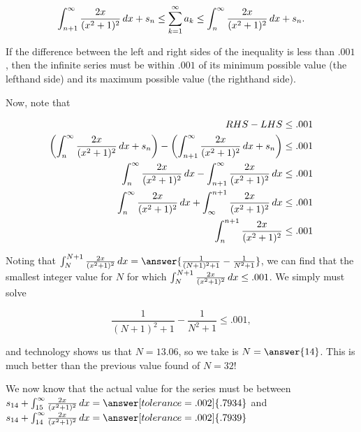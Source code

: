 \documentclass{ximera}
\begin{document}
\begin{exercise}
\begin{exercise}
\begin{exercise}
\begin{exercise}
\begin{exercise}
\[
\int_{n+1}^\infty \frac{2x}{(x^2+1)^2} \mathop{}\!d x  +s_n \leq \sum_{k=1}^{\infty} a_k \leq \int_{n}^\infty \frac{2x}{(x^2+1)^2} \mathop{}\!d x  +s_n.
\]
 
If the difference between the left and right sides of the inequality is less than $.001$, then the infinite series must be within $.001$ of its minimum possible value (the lefthand side) and its maximum possible value (the righthand side).
 
 Now, note that

\begin{align*}
RHS-LHS &\leq .001 \\
\left( \int_{n}^\infty \frac{2x}{(x^2+1)^2} \mathop{}\!d x  +s_n\right) - \left( \int_{n+1}^\infty \frac{2x}{(x^2+1)^2} \mathop{}\!d x  +s_n \right) &\leq .001 \\
 \int_{n}^\infty \frac{2x}{(x^2+1)^2} \mathop{}\!d x  - \int_{n+1}^\infty \frac{2x}{(x^2+1)^2} \mathop{}\!d x   &\leq .001 \\
  \int_{n}^\infty \frac{2x}{(x^2+1)^2} \mathop{}\!d x  +  \int_{\infty}^{n+1} \frac{2x}{(x^2+1)^2} \mathop{}\!d x   &\leq .001 \\
    \int_{n}^{n+1} \frac{2x}{(x^2+1)^2}  &\leq .001 \\
\end{align*} 

Noting that $\int_N^{N+1}  \frac{2x}{(x^2+1)^2} \d x = \answer{\frac{1}{(N+1)^2+1} - \frac{1}{N^2+1}}$, we can find that the smallest integer value for $N$ for which $\int_N^{N+1}  \frac{2x}{(x^2+1)^2} \mathop{}\!d x \leq .001$.  We simply must solve

\[
\frac{1}{(N+1)^2+1} - \frac{1}{N^2+1} \leq .001,
\]

and technology shows us that $N=13.06$, so we take is $N= \answer{14}$.  This is much better than the previous value found of $N=32$!
 
 We now know that the actual value for the series must be between $s_{14} + \int_{15}^\infty \frac{2x}{(x^2+1)^2} \d x = \answer[tolerance=.002]{.7934}$ and $s_{14} + \int_{14}^\infty \frac{2x}{(x^2+1)^2} \d x = \answer[tolerance=.002]{.7939}$

\end{exercise}
\end{exercise}
\end{exercise}








\end{exercise}
\end{exercise}
\end{document}
